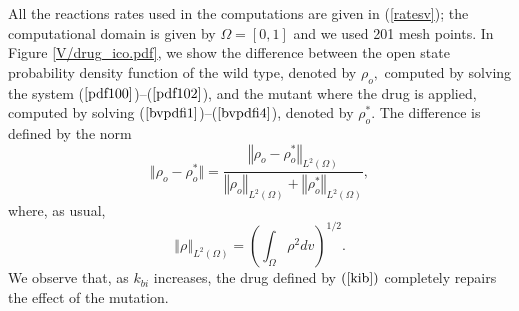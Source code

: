 All the reactions rates used in the computations are given in (\ref{ratesv}); the computational domain
is given by $\Omega=[0,1]$ and we used 201 mesh points. 
In Figure \ref{V/drug_ico.pdf}, we show the difference between the open state probability density
function of the wild type, denoted by $\rho_{o},$ computed by solving the
system ($\ref{pdf100}$)--($\ref{pdf102}$), and the mutant where the
drug is applied, computed by solving ($\ref{bvpdfi1}$)--($\ref{bvpdfi4}$), denoted by $\rho_{o}^{\ast}.$ The difference is defined by the norm%
\begin{equation}
\Vert  \rho_{o}-\rho_{o}^{\ast}\Vert=\frac{\left\Vert \rho_{o}-\rho_{o}^{\ast}\right\Vert _{L^{2}\left(
\Omega\right)  }}{\left\Vert \rho_{o}\right\Vert _{L^{2}\left(  \Omega\right)
}+\left\Vert \rho_{o}^{\ast}\right\Vert _{L^{2}\left(  \Omega\right)  }}, \label{normfrac}%
\end{equation}
where, as usual,%
\[
\left\Vert \rho\right\Vert _{L^{2}\left(  \Omega\right)  }=\left(
\int_{\Omega}\rho^{2}dv\right)  ^{1/2}.
\]
We observe that, as $k_{bi}$ increases, the drug defined by $\left(
\ref{kib}\right)  $ completely repairs the effect of the mutation.





